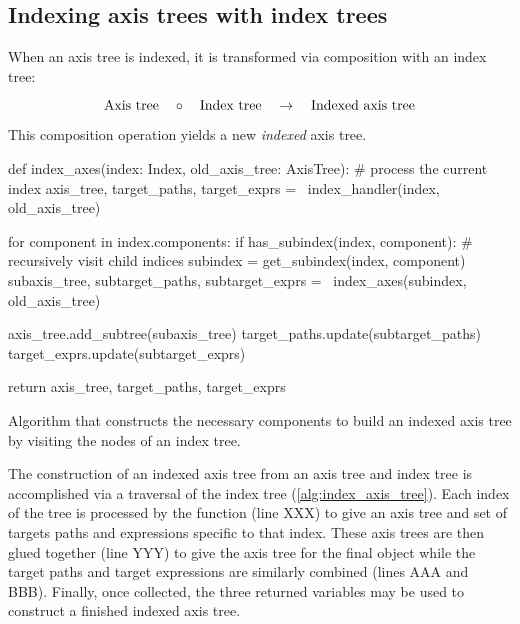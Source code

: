 \documentclass[thesis]{subfiles}
\begin{document}
\subsection{Indexing axis trees with index trees}

When an axis tree is indexed, it is transformed via composition with an index tree:

\begin{equation*}
  \textnormal{Axis tree} \quad \circ \quad \textnormal{Index tree} \quad \to \quad \textnormal{Indexed axis tree}
\end{equation*}

This composition operation yields a new \textit{indexed} axis tree.

\begin{algorithm}
  \begin{pyalg2}
    def index_axes(index: Index, old_axis_tree: AxisTree):
      # process the current index
      axis_tree, target_paths, target_exprs = \
        index_handler(index, old_axis_tree)

      for component in index.components:
        if has_subindex(index, component):
          # recursively visit child indices
          subindex = get_subindex(index, component)
          subaxis_tree, subtarget_paths, subtarget_exprs = \
            index_axes(subindex, old_axis_tree)

          axis_tree.add_subtree(subaxis_tree)
          target_paths.update(subtarget_paths)
          target_exprs.update(subtarget_exprs)

      return axis_tree, target_paths, target_exprs
  \end{pyalg2}

  \caption{
    Algorithm that constructs the necessary components to build an indexed axis tree by visiting the nodes of an index tree.
  }
  \label{alg:index_axis_tree}
\end{algorithm}

The construction of an indexed axis tree from an axis tree and index tree is accomplished via a traversal of the index tree (\cref{alg:index_axis_tree}).
Each index of the tree is processed by the function  (line XXX) to give an axis tree and set of targets paths and expressions specific to that index.
These axis trees are then glued together (line YYY) to give the axis tree for the final object while the target paths and target expressions are similarly combined (lines AAA and BBB).
Finally, once collected, the three returned variables may be used to construct a finished indexed axis tree.
\end{document}

